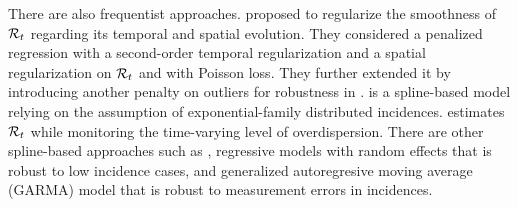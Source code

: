 There are also frequentist approaches. 
\cite{abry2020spatial} proposed to regularize the smoothness of $\mathcal{R}_t$ regarding its temporal and spatial evolution. They considered a penalized regression with a second-order temporal regularization and a spatial regularization on $\mathcal{R}_t$ and with Poisson loss. They further extended it by introducing another penalty on outliers for robustness in \cite{pascal2022nonsmooth}.  
%
\cite{pircal2023spline} is a spline-based model relying on the assumption of exponential-family distributed incidences. %
\cite{ho2023accounting} estimates $\mathcal{R}_t$ while monitoring the time-varying level of overdispersion. 
%
There are other spline-based approaches such as \cite{azmon2014estimation,gressani2021approximate,pircalabelu2023spline}, regressive models with random effects \citep{jin2023epimix} that is robust to low incidence cases, and generalized autoregresive moving average (GARMA) model \citep{hettinger2023estimating} that is robust to measurement errors in incidences. 
%


